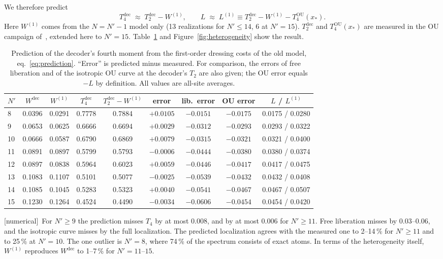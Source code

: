 \documentclass[11pt]{article}
\newcommand{\Np}{N'}
\newcommand{\dec}{\mathrm{dec}}
\newcommand{\OU}{\mathrm{OU}}
\newcommand{\Wone}{W^{(1)}}
\newcommand{\tagbox}[2]{\textsf{\small\color{#1}[#2]}}
\newcommand{\NUM}{\tagbox{cnum}{numerical}}
\theoremstyle{plain}
\theoremstyle{remark}
\numberwithin{equation}{section}
\begin{document}
We therefore predict
\begin{equation}\label{eq:prediction}
T_4^\dec\;\approx\;T_2^\dec-\Wone,\qquad
L\;\approx\;L^{(1)}\equiv T_2^\dec-\Wone-T_4^\OU(x_*).
\end{equation}
Here $\Wone$ comes from the $N=\Np-1$ model only (13 realizations for $\Np\le14$, 6 at $\Np=15$). $T_2^\dec$ and
$T_4^\OU(x_*)$ are measured in the OU campaign of~\cite{prog1005}, extended here to $\Np=15$. Table~\ref{tab:prediction} and
Figure~\ref{fig:heterogeneity} show the result.

\begin{table}[ht]
\centering\small
\caption{Prediction of the decoder's fourth moment from the first-order dressing costs of the old model,
eq.~\eqref{eq:prediction}. ``Error'' is predicted minus measured. For comparison, the errors of free liberation and of
the isotropic OU curve at the decoder's $T_2$ are also given; the OU error equals $-L$ by definition. All values are
all-site averages.}
\label{tab:prediction}
\setlength{\tabcolsep}{4.5pt}
\begin{tabular}{lcccccccc}\toprule
$\Np$ & $W^\dec$ & $\Wone$ & $T_4^\dec$ & $T_2^\dec-\Wone$ & error & lib.\ error & OU error & $L$ / $L^{(1)}$\\\midrule
8  & 0.0396 & 0.0291 & 0.7778 & 0.7884 & $+0.0105$ & $-0.0151$ & $-0.0175$ & 0.0175 / 0.0280\\
9  & 0.0653 & 0.0625 & 0.6666 & 0.6694 & $+0.0029$ & $-0.0312$ & $-0.0293$ & 0.0293 / 0.0322\\
10 & 0.0666 & 0.0587 & 0.6790 & 0.6869 & $+0.0079$ & $-0.0315$ & $-0.0321$ & 0.0321 / 0.0400\\
11 & 0.0891 & 0.0897 & 0.5799 & 0.5793 & $-0.0006$ & $-0.0444$ & $-0.0380$ & 0.0380 / 0.0374\\
12 & 0.0897 & 0.0838 & 0.5964 & 0.6023 & $+0.0059$ & $-0.0446$ & $-0.0417$ & 0.0417 / 0.0475\\
13 & 0.1083 & 0.1107 & 0.5101 & 0.5077 & $-0.0025$ & $-0.0539$ & $-0.0432$ & 0.0432 / 0.0408\\
14 & 0.1085 & 0.1045 & 0.5283 & 0.5323 & $+0.0040$ & $-0.0541$ & $-0.0467$ & 0.0467 / 0.0507\\
15 & 0.1230 & 0.1264 & 0.4524 & 0.4490 & $-0.0034$ & $-0.0606$ & $-0.0454$ & 0.0454 / 0.0420\\\bottomrule
\end{tabular}
\end{table}

\NUM\ For $\Np\ge9$ the prediction misses $T_4$ by at most $0.008$, and by at most $0.006$ for $\Np\ge11$. Free liberation
misses by $0.03$--$0.06$, and the isotropic curve misses by the full localization. The predicted localization agrees with
the measured one to 2--14\,\% for $\Np\ge11$ and to 25\,\% at $\Np=10$. The one outlier is $\Np=8$, where 74\,\% of the
spectrum consists of exact atoms. In terms of the heterogeneity itself, $\Wone$ reproduces $W^\dec$ to 1--7\,\% for
$\Np=11$--$15$.
\end{document}
